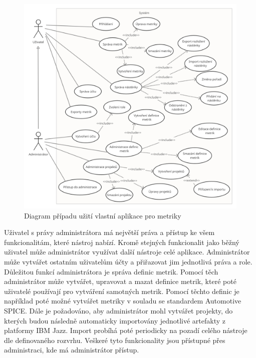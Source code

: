 \documentclass[czech,master,public,dept460,male,cpdeclaration,oneside]{diploma}
\begin{document}
\begin{figure}[!ht]
    \centering
    \includegraphics[width=1\textwidth]{Diplomka/Figures/use_case_jazz.png}
    \caption{Diagram případu užití vlastní aplikace pro metriky}
    \label{fig:jazz_metrics_use_case}
\end{figure}

Uživatel s právy administrátora má největší práva a přístup ke všem funkcionalitám, které nástroj nabízí. Kromě stejných funkcionalit jako běžný uživatel může administrátor využívat další nástroje celé aplikace. Administrátor může vytvářet ostatním uživatelům účty a přiřazovat jim jednotlivá práva a role. Důležitou funkcí administrátora je správa definic metrik. Pomocí těch administrátor může vytvářet, upravovat a mazat definice metrik, které poté uživatelé používají pro vytváření samotných metrik. Pomocí těchto definic je například poté možné vytvářet metriky v souladu se standardem Automotive SPICE. Dále je požadováno, aby administrátor mohl vytvářet projekty, do kterých budou následně automaticky importovány jednotlivé artefakty z platformy IBM Jazz. Import probíhá poté periodicky na pozadí celého nástroje dle definovaného rozvrhu. Veškeré tyto funkcionality jsou přístupné přes administraci, kde má administrátor přístup.
\end{document}
